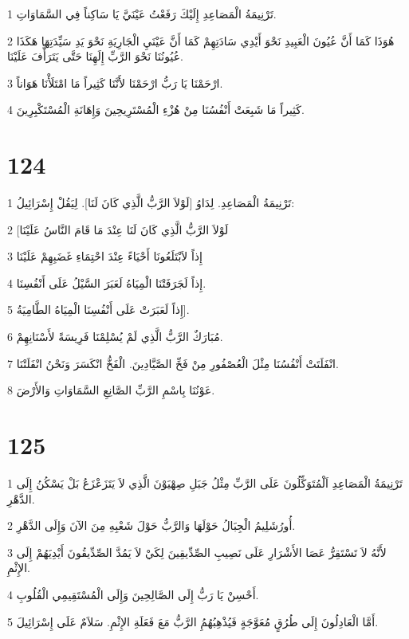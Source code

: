 \par 1 تَرْنِيمَةُ الْمَصَاعِدِ إِلَيْكَ رَفَعْتُ عَيْنَيَّ يَا سَاكِناً فِي السَّمَاوَاتِ.
\par 2 هُوَذَا كَمَا أَنَّ عُيُونَ الْعَبِيدِ نَحْوَ أَيْدِي سَادَتِهِمْ كَمَا أَنَّ عَيْنَيِ الْجَارِيَةِ نَحْوَ يَدِ سَيِّدَتِهَا هَكَذَا عُيُونُنَا نَحْوَ الرَّبِّ إِلَهِنَا حَتَّى يَتَرَأَّفَ عَلَيْنَا.
\par 3 ارْحَمْنَا يَا رَبُّ ارْحَمْنَا لأَنَّنَا كَثِيراً مَا امْتَلَأْنَا هَوَاناً.
\par 4 كَثِيراً مَا شَبِعَتْ أَنْفُسُنَا مِنْ هُزْءِ الْمُسْتَرِيحِينَ وَإِهَانَةِ الْمُسْتَكْبِرِينَ.

\chapter{124}

\par 1 تَرْنِيمَةُ الْمَصَاعِدِ. لِدَاوُ [لَوْلاَ الرَّبُّ الَّذِي كَانَ لَنَا]. لِيَقُلْ إِسْرَائِيلُ:
\par 2 [لَوْلاَ الرَّبُّ الَّذِي كَانَ لَنَا عِنْدَ مَا قَامَ النَّاسُ عَلَيْنَا
\par 3 إِذاً لاَبْتَلَعُونَا أَحْيَاءً عِنْدَ احْتِمَاءِ غَضَبِهِمْ عَلَيْنَا
\par 4 إِذاً لَجَرَفَتْنَا الْمِيَاهُ لَعَبَرَ السَّيْلُ عَلَى أَنْفُسِنَا.
\par 5 إِذاً لَعَبَرَتْ عَلَى أَنْفُسِنَا الْمِيَاهُ الطَّامِيَةُ].
\par 6 مُبَارَكٌ الرَّبُّ الَّذِي لَمْ يُسْلِمْنَا فَرِيسَةً لأَسْنَانِهِمْ.
\par 7 انْفَلَتَتْ أَنْفُسُنَا مِثْلَ الْعُصْفُورِ مِنْ فَخِّ الصَّيَّادِينَ. الْفَخُّ انْكَسَرَ وَنَحْنُ انْفَلَتْنَا.
\par 8 عَوْنُنَا بِاسْمِ الرَّبِّ الصَّانِعِ السَّمَاوَاتِ وَالأَرْضَ.

\chapter{125}

\par 1 تَرْنِيمَةُ الْمَصَاعِدِ اَلْمُتَوَكِّلُونَ عَلَى الرَّبِّ مِثْلُ جَبَلِ صِهْيَوْنَ الَّذِي لاَ يَتَزَعْزَعُ بَلْ يَسْكُنُ إِلَى الدَّهْرِ.
\par 2 أُورُشَلِيمُ الْجِبَالُ حَوْلَهَا وَالرَّبُّ حَوْلَ شَعْبِهِ مِنَ الآنَ وَإِلَى الدَّهْرِ.
\par 3 لأَنَّهُ لاَ تَسْتَقِرُّ عَصَا الأَشْرَارِ عَلَى نَصِيبِ الصِّدِّيقِينَ لِكَيْ لاَ يَمُدَّ الصِّدِّيقُونَ أَيْدِيَهُمْ إِلَى الإِثْمِ.
\par 4 أَحْسِنْ يَا رَبُّ إِلَى الصَّالِحِينَ وَإِلَى الْمُسْتَقِيمِي الْقُلُوبِ.
\par 5 أَمَّا الْعَادِلُونَ إِلَى طُرُقٍ مُعَوَّجَةٍ فَيُذْهِبُهُمُِ الرَّبُّ مَعَ فَعَلَةِ الإِثْمِ. سَلاَمٌ عَلَى إِسْرَائِيلَ.

